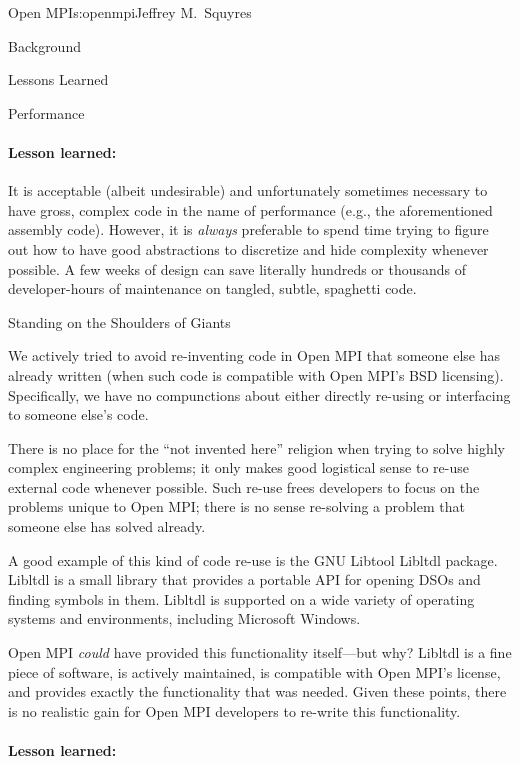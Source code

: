 \begin{aosachapter}{Open MPI}{s:openmpi}{Jeffrey M.\ Squyres}
\begin{aosasect1}{Background}
\begin{aosasect1}{Lessons Learned}
\begin{aosasect2}{Performance}

\paragraph{Lesson learned:} 

It is acceptable (albeit undesirable) and unfortunately sometimes
necessary to have gross, complex code in the name of performance
(e.g., the aforementioned assembly code).
%
However, it is \emph{always} preferable to spend time trying to figure
out how to have good abstractions to discretize and hide complexity
whenever possible.  A few weeks of design can save literally hundreds
or thousands of developer-hours of maintenance on tangled, subtle, spaghetti
code.

\end{aosasect2}


\begin{aosasect2}{Standing on the Shoulders of Giants}

We actively tried to avoid re-inventing code in Open MPI that someone
else has already written (when such code is compatible with Open
MPI's BSD licensing).
%
Specifically, we have no compunctions about either directly re-using
or interfacing to someone else's code.

There is no place for the ``not invented here'' religion when trying
to solve highly complex engineering problems; it only makes good
logistical sense to re-use external code whenever possible.
%
Such re-use frees developers to focus on the problems unique to Open
MPI; there is no sense re-solving a problem that someone else has
solved already.

A good example of this kind of code re-use is the GNU Libtool Libltdl
package.  Libltdl is a small library that provides a portable API for
opening DSOs and finding symbols in them.  Libltdl is supported on a
wide variety of operating systems and environments, including
Microsoft Windows.

Open MPI \emph{could} have provided this functionality itself---but
why?
%
Libltdl is a fine piece of software, is actively maintained, is
compatible with Open MPI's license, and provides exactly the
functionality that was needed.
%
Given these points, there is no realistic gain for Open MPI developers
to re-write this functionality.


\paragraph{Lesson learned:} 


\end{aosasect2}
\end{aosasect1}
\end{aosasect1}
\end{aosachapter}
